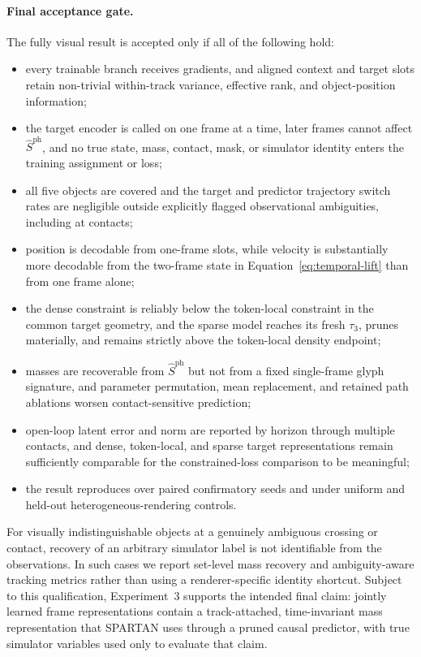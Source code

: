 \paragraph{Final acceptance gate.}
The fully visual result is accepted only if all of the following hold:
\begin{itemize}
    \item every trainable branch receives gradients, and aligned context and target slots retain
          non-trivial within-track variance, effective rank, and object-position information;
    \item the target encoder is called on one frame at a time, later frames cannot affect
          $\widehat S^{\mathrm{ph}}$, and no true state, mass, contact, mask, or simulator identity
          enters the training assignment or loss;
    \item all five objects are covered and the target and predictor trajectory switch rates are
          negligible outside explicitly flagged observational ambiguities, including at contacts;
    \item position is decodable from one-frame slots, while velocity is substantially more
          decodable from the two-frame state in Equation~\eqref{eq:temporal-lift} than from one
          frame alone;
    \item the dense constraint is reliably below the token-local constraint in the common target
          geometry, and the sparse model reaches its fresh $\tau_3$, prunes materially, and
          remains strictly above the token-local density endpoint;
    \item masses are recoverable from $\widehat S^{\mathrm{ph}}$ but not from a fixed
          single-frame glyph signature, and parameter permutation, mean replacement, and retained
          path ablations worsen contact-sensitive prediction;
    \item open-loop latent error and norm are reported by horizon through multiple contacts, and
          dense, token-local, and sparse target representations remain sufficiently comparable for
          the constrained-loss comparison to be meaningful;
    \item the result reproduces over paired confirmatory seeds and under uniform and held-out
          heterogeneous-rendering controls.
\end{itemize}

For visually indistinguishable objects at a genuinely ambiguous crossing or contact, recovery of
an arbitrary simulator label is not identifiable from the observations.  In such cases we report
set-level mass recovery and ambiguity-aware tracking metrics rather than using a renderer-specific
identity shortcut.  Subject to this qualification, Experiment~3 supports the intended final
claim: jointly learned frame representations contain a track-attached, time-invariant mass
representation that SPARTAN uses through a pruned causal predictor, with true simulator variables
used only to evaluate that claim.
